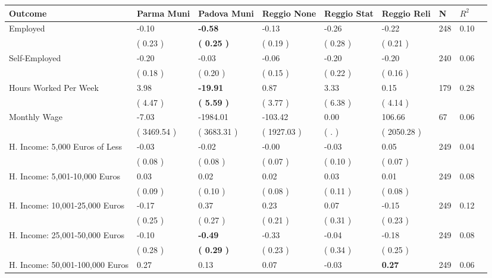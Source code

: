 \begin{tabular}{L{6.2cm} C{1.8cm} C{1.8cm} C{1.8cm} C{1.8cm} C{1.8cm} C{1.8cm} C{0.3cm} C{0.3cm}}
\toprule
 \textbf{Outcome} & \textbf{Parma Muni} & \textbf{Padova Muni} & \textbf{Reggio None} & \textbf{Reggio Stat} & \textbf{Reggio Reli} & \textbf{N} & \textbf{$ R^2$} \\
\midrule
Employed &     -0.10 & \textbf{    -0.58} &     -0.13 &     -0.26 &     -0.22  & 248 &       0.10 \\ 
 & (     0.23 ) & \textbf{(     0.25 )} & (     0.19 ) & (     0.28 ) & (     0.21 )  & \\
Self-Employed &     -0.20 &     -0.03 &     -0.06 &     -0.20 &     -0.20  & 240 &       0.06 \\ 
 & (     0.18 ) & (     0.20 ) & (     0.15 ) & (     0.22 ) & (     0.16 )  & \\
Hours Worked Per Week &      3.98 & \textbf{   -19.91} &      0.87 &      3.33 &      0.15  & 179 &       0.28 \\ 
 & (     4.47 ) & \textbf{(     5.59 )} & (     3.77 ) & (     6.38 ) & (     4.14 )  & \\
Monthly Wage &     -7.03 &  -1984.01 &   -103.42 &      0.00 &    106.66  & 67 &       0.06 \\ 
 & (  3469.54 ) & (  3683.31 ) & (  1927.03 ) & (        . ) & (  2050.28 )  & \\
H. Income: 5,000 Euros of Less &     -0.03 &     -0.02 &     -0.00 &     -0.03 &      0.05  & 249 &       0.04 \\ 
 & (     0.08 ) & (     0.08 ) & (     0.07 ) & (     0.10 ) & (     0.07 )  & \\
H. Income: 5,001-10,000 Euros &      0.03 &      0.02 &      0.02 &      0.03 &      0.01  & 249 &       0.08 \\ 
 & (     0.09 ) & (     0.10 ) & (     0.08 ) & (     0.11 ) & (     0.08 )  & \\
H. Income: 10,001-25,000 Euros &     -0.17 &      0.37 &      0.23 &      0.07 &     -0.15  & 249 &       0.12 \\ 
 & (     0.25 ) & (     0.27 ) & (     0.21 ) & (     0.31 ) & (     0.23 )  & \\
H. Income: 25,001-50,000 Euros &     -0.10 & \textbf{    -0.49} &     -0.33 &     -0.04 &     -0.18  & 249 &       0.08 \\ 
 & (     0.28 ) & \textbf{(     0.29 )} & (     0.23 ) & (     0.34 ) & (     0.25 )  & \\
H. Income: 50,001-100,000 Euros &      0.27 &      0.13 &      0.07 &     -0.03 & \textbf{     0.27}  & 249 &       0.06 \\ 

\end{tabular}

